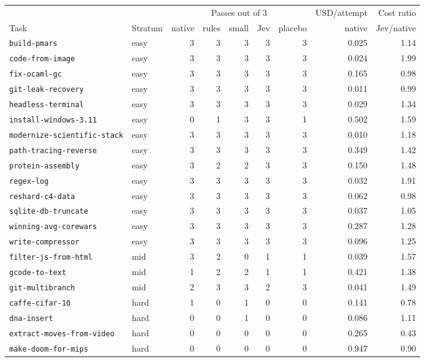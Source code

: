 \begin{tabular}{llrrrrrrr}
\toprule
& & \multicolumn{5}{c}{Passes out of 3} & USD/attempt & Cost ratio \\
\cmidrule(lr){3-7}
Task & Stratum & native & rules & small & Jev & placebo & native & Jev/native \\
\midrule
\texttt{build-pmars} & easy & 3 & 3 & 3 & 3 & 3 & 0.025 & 1.14 \\
\texttt{code-from-image} & easy & 3 & 3 & 3 & 3 & 3 & 0.024 & 1.99 \\
\texttt{fix-ocaml-gc} & easy & 3 & 3 & 3 & 3 & 3 & 0.165 & 0.98 \\
\texttt{git-leak-recovery} & easy & 3 & 3 & 3 & 3 & 3 & 0.011 & 0.99 \\
\texttt{headless-terminal} & easy & 3 & 3 & 3 & 3 & 3 & 0.029 & 1.34 \\
\texttt{install-windows-3.11} & easy & 0 & 1 & 3 & 3 & 1 & 0.502 & 1.59 \\
\texttt{modernize-scientific-stack} & easy & 3 & 3 & 3 & 3 & 3 & 0.010 & 1.18 \\
\texttt{path-tracing-reverse} & easy & 3 & 3 & 3 & 3 & 3 & 0.349 & 1.42 \\
\texttt{protein-assembly} & easy & 3 & 2 & 2 & 3 & 3 & 0.150 & 1.48 \\
\texttt{regex-log} & easy & 3 & 3 & 3 & 3 & 3 & 0.032 & 1.91 \\
\texttt{reshard-c4-data} & easy & 3 & 3 & 3 & 3 & 3 & 0.062 & 0.98 \\
\texttt{sqlite-db-truncate} & easy & 3 & 3 & 3 & 3 & 3 & 0.037 & 1.05 \\
\texttt{winning-avg-corewars} & easy & 3 & 3 & 3 & 3 & 3 & 0.287 & 1.28 \\
\texttt{write-compressor} & easy & 3 & 3 & 3 & 3 & 3 & 0.096 & 1.25 \\
\texttt{filter-js-from-html} & mid & 3 & 2 & 0 & 1 & 1 & 0.039 & 1.57 \\
\texttt{gcode-to-text} & mid & 1 & 2 & 2 & 1 & 1 & 0.421 & 1.38 \\
\texttt{git-multibranch} & mid & 2 & 3 & 3 & 2 & 3 & 0.041 & 1.49 \\
\texttt{caffe-cifar-10} & hard & 1 & 0 & 1 & 0 & 0 & 0.141 & 0.78 \\
\texttt{dna-insert} & hard & 0 & 0 & 1 & 0 & 0 & 0.086 & 1.11 \\
\texttt{extract-moves-from-video} & hard & 0 & 0 & 0 & 0 & 0 & 0.265 & 0.43 \\
\texttt{make-doom-for-mips} & hard & 0 & 0 & 0 & 0 & 0 & 0.947 & 0.90 \\
\bottomrule
\end{tabular}
